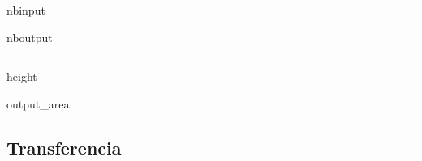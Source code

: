 \documentclass[letterpaper,10pt,english]{sphinxmanual}
\begin{document}
\begin{sphinxuseclass}{nbinput}
{\begin{sphinxVerbatim}[commandchars=\\\{\}]
     

       
\end{sphinxVerbatim}
}

\end{sphinxuseclass}
\begin{sphinxuseclass}{nboutput}
\hrule height -\fboxrule\relax
\vspace{\nbsphinxcodecellspacing}

\makeatletter\setbox\nbsphinxpromptbox\box\voidb@x\makeatother

\begin{nbsphinxfancyoutput}

\begin{sphinxuseclass}{output_area}
\begin{sphinxuseclass}{}

\section{Transferencia}
\label{\detokenize{tp-semanal:Transferencia}}
\end{sphinxuseclass}
\end{sphinxuseclass}
\end{nbsphinxfancyoutput}

\end{sphinxuseclass}
\end{document}
